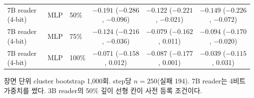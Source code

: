 \begin{table}[htbp]
\begin{tabular}{@{}lllccc@{}}
7B reader (4-bit) & MLP & 50\% & $-0.191$ ($-0.286$, $-0.096$) & $-0.122$ ($-0.221$, $-0.021$) & $-0.149$ ($-0.226$, $-0.072$) \\
7B reader (4-bit) & MLP & 75\% & $-0.124$ ($-0.216$, $-0.036$) & $-0.079$ ($-0.162$, 0.011) & $-0.094$ ($-0.170$, $-0.020$) \\
7B reader (4-bit) & MLP & 100\% & $-0.071$ ($-0.158$, 0.012) & $-0.087$ ($-0.177$, 0.001) & $-0.039$ ($-0.115$, 0.031) \\
\bottomrule
\end{tabular}
\par\smallskip\raggedright\footnotesize
장면 단위 cluster bootstrap 1,000회. step당 $n = 250$(실패 194). 7B reader는 4비트 가중치를 썼다. 3B reader의 50\% 깊이 선형 칸이 사전 등록 조건이다.
\end{table}
